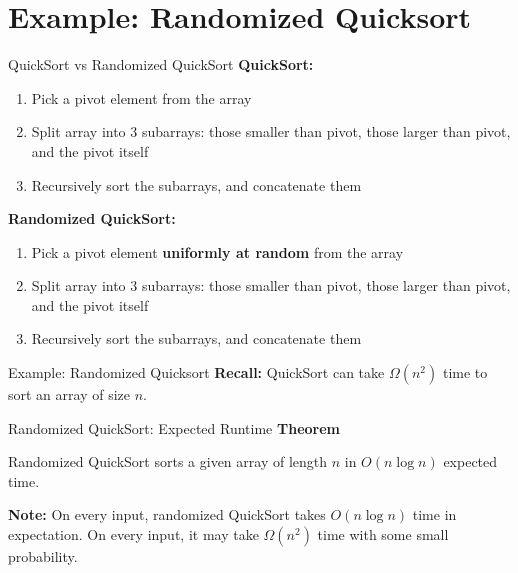 \documentclass[aspectratio=169]{beamer}
\begin{document}
\section{Example: Randomized Quicksort}

\begin{frame}{QuickSort vs Randomized QuickSort}
\textbf{QuickSort:}
\begin{enumerate}
  \item Pick a pivot element from the array
  \item Split array into 3 subarrays: those smaller than pivot, those larger than pivot, and the pivot itself
  \item Recursively sort the subarrays, and concatenate them
\end{enumerate}
  \vspace{1em}
  \textbf{Randomized QuickSort:}
  \begin{enumerate}
    \item Pick a pivot element \textbf{uniformly at random} from the array
    \item Split array into 3 subarrays: those smaller than pivot, those larger than pivot, and the pivot itself
    \item Recursively sort the subarrays, and concatenate them
  \end{enumerate}
  \end{frame}

\begin{frame}{Example: Randomized Quicksort}
  \textbf{Recall:} QuickSort can take $\Omega(n^2)$ time to sort an array of size $n$.
\end{frame}

\begin{frame}{Randomized QuickSort: Expected Runtime}
\textbf{Theorem}
\begin{block}{}
  Randomized QuickSort sorts a given array of length $n$ in $O(n \log n)$ expected time.
\end{block}
  \vspace{1em}
  \textbf{Note:} On every input, randomized QuickSort takes $O(n \log n)$ time in expectation. On every input, it may take $\Omega(n^2)$ time with some small probability.
\end{frame}



\end{document}
